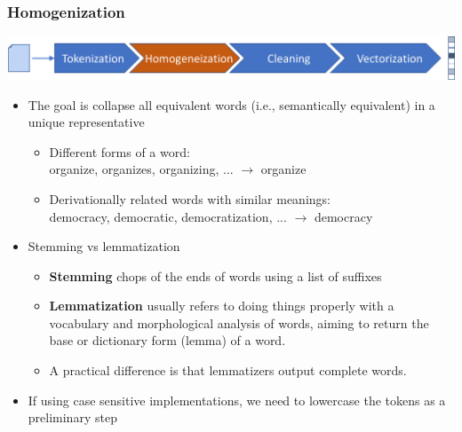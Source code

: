 \documentclass{beamer}
\begin{document}
\begin{frame}

    \frametitle{Homogenization}

    \centerline{\includegraphics[width=\textwidth]{./figs/NLPTM_homogenization.png}}

    \begin{itemize}
    	\item The goal is collapse all equivalent words (i.e., semantically equivalent) in a unique representative
    		\begin{itemize}
    			\item Different forms of a word: \\ 
    			organize, organizes, organizing, ... $\rightarrow$ organize 
    			\item Derivationally related words with similar meanings: \\ democracy, democratic, democratization, ... $\rightarrow$ democracy
    		\end{itemize}
    		
    	\item Stemming vs lemmatization
    		\begin{itemize}
    			\item {\bf Stemming} chops of the ends of words using a list of suffixes
    			\item {\bf Lemmatization} usually refers to doing things properly with a vocabulary and morphological analysis of words, aiming to return the base or dictionary form (lemma) of a word. 
				\item A practical difference is that lemmatizers output complete words.

    		\end{itemize}
    		
    	\item If using case sensitive implementations, we need to lowercase the tokens as a preliminary step
    	
    \end{itemize}
    
\end{frame}
\end{document}
